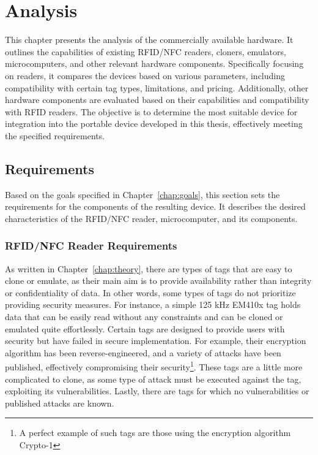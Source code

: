 \chapter{Analysis}
\label{chap:analysis}

This chapter presents the analysis of the commercially available hardware. It outlines the capabilities of existing RFID/NFC readers, cloners, emulators, microcomputers, and other relevant hardware components. Specifically focusing on readers, it compares the devices based on various parameters, including compatibility with certain tag types, limitations, and pricing. Additionally, other hardware components are evaluated based on their capabilities and compatibility with RFID readers. The objective is to determine the most suitable device for integration into the portable device developed in this thesis, effectively meeting the specified requirements.


\section{Requirements}
\label{sec:requirements}

Based on the goals specified in Chapter~\ref{chap:goals}, this section sets the requirements for the components of the resulting device. It describes the desired characteristics of the RFID/NFC reader, microcomputer, and its components.

\subsection{RFID/NFC Reader Requirements}

As written in Chapter~\ref{chap:theory}, there are types of tags that are easy to clone or emulate, as their main aim is to provide availability rather than integrity or confidentiality of data. In other words, some types of tags do not prioritize providing security measures. For instance, a simple 125 kHz EM410x tag holds data that can be easily read without any constraints and can be cloned or emulated quite effortlessly. Certain tags are designed to provide users with security but have failed in secure implementation. For example, their encryption algorithm has been reverse-engineered, and a variety of attacks have been published, effectively compromising their security\footnote{A perfect example of such tags are those using the encryption algorithm Crypto-1}. These tags are a little more complicated to clone, as some type of attack must be executed against the tag, exploiting its vulnerabilities. Lastly, there are tags for which no vulnerabilities or published attacks are known.

